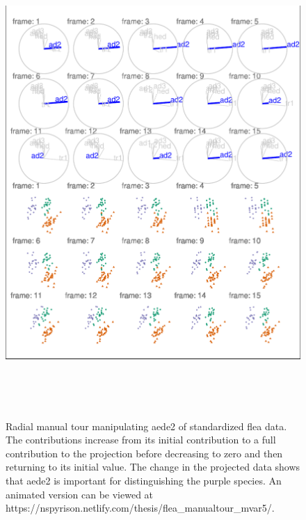 \begin{Schunk}
\begin{figure}

{\centering \includegraphics[width=5.83in,height=7in]{spinifex_paper_files/figure-latex/step3-1} 

}

\caption[Radial manual tour manipulating aede2 of standardized flea data]{Radial manual tour manipulating aede2 of standardized flea data.  The contributions increase from its initial contribution to a full contribution to the projection before decreasing to zero and then returning to its initial value. The change in the projected data shows that aede2 is important for distinguishing the purple species. An animated version can be viewed at  https://nspyrison.netlify.com/thesis/flea\_manualtour\_mvar5/.}\label{fig:step3}
\end{figure}
\end{Schunk}

